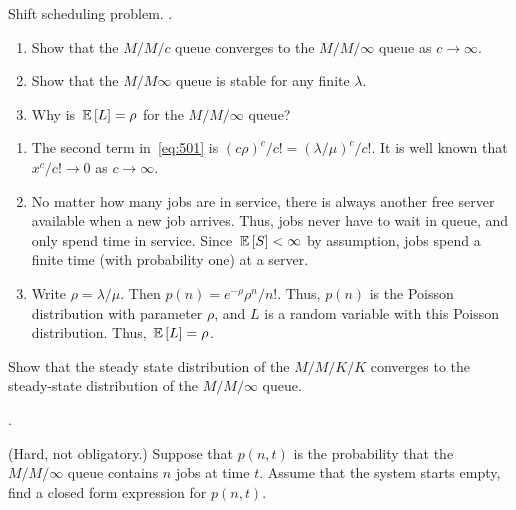 \begin{question}[use=false]
  Shift scheduling problem. 
\TBD.
\end{question}



\begin{question}
  \begin{enumerate}
  \item Show that the $M/M/c$ queue converges to the $M/M/\infty$ queue as $c\to\infty$. 
\item Show that the $M/M\infty$ queue is stable for any finite $\lambda$. 
\item Why is $\,\mathbb{E}\left[L\right]=\rho$ for the $M/M/\infty$ queue? 
  \end{enumerate}
 \begin{solution}
   \begin{enumerate}
   \item 
   The second term in~\eqref{eq:501} is $(c\rho)^c/c! = (\lambda/\mu)^c/c!$. It is well
   known that $x^c/c!\to 0$ as $c\to \infty$.

 \item    No matter how many jobs are in service, there is always another
   free server available when a new job arrives. Thus, jobs never have
   to wait in queue, and only spend time in service. Since
   $\,\mathbb{E}\left[S\right] < \infty$ by assumption, jobs spend a finite time (with
   probability one) at a server.
 \item 
   Write $\rho = \lambda /\mu$. Then $p(n) = e^{-\rho} \rho^n/n!$.
   Thus, $p(n)$ is the Poisson distribution with parameter $\rho$,
   and $L$ is a random variable with this Poisson distribution. Thus,
   $\,\mathbb{E}\left[L\right] = \rho$.

   \end{enumerate}

\end{solution}
\end{question}

\begin{question}[use=false]
  Show that the steady state distribution of the $M/M/K/K$ converges
  to the steady-state distribution of the $M/M/\infty$ queue.
  \begin{solution}
    \TBD.
  \end{solution}
\end{question}

\begin{question}[use=false]
  (Hard, not obligatory.)  Suppose that $p(n,t)$ is the probability
  that the $M/M/\infty$ queue contains $n$ jobs at time $t$. Assume
  that the system starts empty, find a closed form expression for
  $p(n,t)$. 
\begin{solution}\TBD
 \end{solution}
\end{question}



